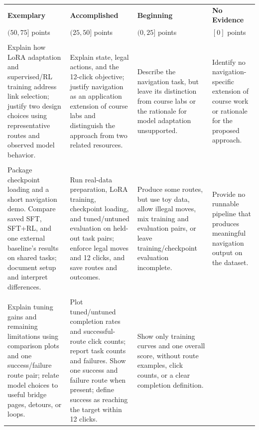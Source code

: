 \documentclass[10pt,letterpaper]{article}
\begin{document}
\begingroup
\small
\setlength{\tabcolsep}{4pt}
\renewcommand{\arraystretch}{1.1}
\begin{tabularx}{\linewidth}{@{}*{4}{>{\raggedright\arraybackslash}X}@{}}
  \hline
  \textbf{Exemplary} & \textbf{Accomplished} & \textbf{Beginning} & \textbf{No Evidence} \\
  $(50,75]$ points & $(25,50]$ points & $(0,25]$ points & $[0]$ points \\
  \hline
  \multicolumn{4}{@{}l}{\textbf{R1: Conceptual Exploration}} \\
  Explain how LoRA adaptation and supervised/RL training address link
  selection; justify two design choices using representative routes and
  observed model behavior.
  & Explain state, legal actions, and the 12-click objective; justify navigation
  as an application extension of course labs and distinguish the approach
  from two related resources.
  & Describe the navigation task, but leave its distinction from course labs
  or the rationale for model adaptation unsupported.
  & Identify no navigation-specific extension of course work or rationale
  for the proposed approach. \\
  \hline
  \multicolumn{4}{@{}l}{\textbf{R2: Implementation / Programming}} \\
  Package checkpoint loading and a short navigation demo. Compare saved SFT, SFT+RL, and one external baseline's results
  on shared tasks; document setup and interpret differences.
  & Run real-data preparation, LoRA training, checkpoint loading, and
  tuned/untuned evaluation on held-out task pairs; enforce legal moves and
  12 clicks, and save routes and outcomes.
  & Produce some routes, but use toy data, allow illegal moves, mix training
  and evaluation pairs, or leave training/checkpoint evaluation incomplete.
  & Provide no runnable pipeline that produces meaningful navigation output
  on the dataset. \\
  \hline
  \multicolumn{4}{@{}l}{\textbf{R3: Data Visualization / Analysis}} \\
  Explain tuning gains and remaining limitations using comparison plots
  and one success/failure route pair; relate model choices to useful
  bridge pages, detours, or loops.
  & Plot tuned/untuned completion rates and successful-route click counts;
  report task counts and failures. Show one success and failure route when
  present; define success as reaching the target within 12 clicks.
  & Show only training curves and one overall score, without route examples,
  click counts, or a clear completion definition.

\end{tabularx}
\end{document}
